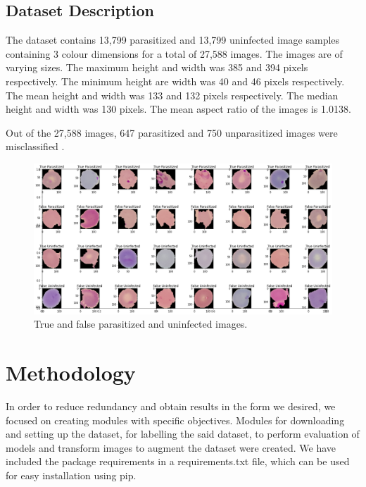 \documentclass[10pt,twocolumn,letterpaper]{article}
\begin{document}
\subsection{Dataset Description}
The dataset contains 13,799 parasitized and 13,799 uninfected image samples containing 3 colour dimensions for a total of 27,588 images. The images are of varying sizes. The maximum height and width was 385 and 394 pixels respectively. The minimum height are width was 40 and 46 pixels respectively. The mean height and width was 133 and 132 pixels respectively. The median height and width was 130 pixels. The mean aspect ratio of the images is 1.0138.

Out of the 27,588 images, 647 parasitized and 750 unparasitized images were misclassified \cite{fuhadmalaria}.

\begin{figure}[t]
   \begin{center}
      \includegraphics[width=1\linewidth]{../Plots/image_vis.png}
   \end{center}
      \caption{True and false parasitized and uninfected images.}
   \label{fig:malaria_image}
\end{figure}

\section{Methodology}

In order to reduce redundancy and obtain results in the form we desired, we focused on creating modules with specific objectives. Modules for downloading and setting up the dataset, for labelling the said dataset, to perform evaluation of models and transform images to augment the dataset were created. We have included the package requirements in a requirements.txt file, which can be used for easy installation using pip.
\end{document}
